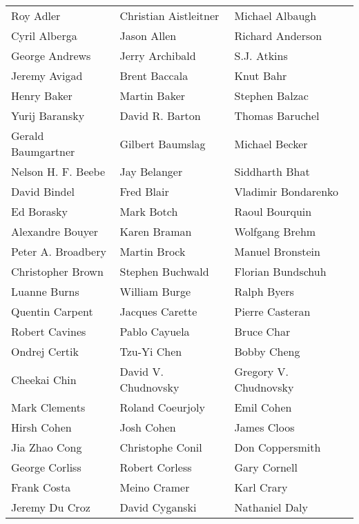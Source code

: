 \begin{tabular}{lll}
Roy Adler              & Christian Aistleitner  & Michael Albaugh\\
Cyril Alberga          & Jason Allen            & Richard Anderson\\
George Andrews         & Jerry Archibald        & S.J. Atkins\\
Jeremy Avigad          & Brent Baccala          & Knut Bahr\\
Henry Baker            & Martin Baker           & Stephen Balzac\\
Yurij Baransky         & David R. Barton        & Thomas Baruchel\\
Gerald Baumgartner     & Gilbert Baumslag       & Michael Becker\\
Nelson H. F. Beebe     & Jay Belanger           & Siddharth Bhat\\
David Bindel           & Fred Blair             & Vladimir Bondarenko\\
Ed Borasky             & Mark Botch             & Raoul Bourquin\\
Alexandre Bouyer       & Karen Braman           & Wolfgang Brehm\\
Peter A. Broadbery     & Martin Brock           & Manuel Bronstein\\
Christopher Brown      & Stephen Buchwald       & Florian Bundschuh\\
Luanne Burns           & William Burge          & Ralph Byers\\
Quentin Carpent        & Jacques Carette        & Pierre Casteran\\
Robert Cavines         & Pablo Cayuela          & Bruce Char\\
Ondrej Certik          & Tzu-Yi Chen            & Bobby Cheng\\
Cheekai Chin           & David V. Chudnovsky    & Gregory V. Chudnovsky\\
Mark Clements          & Roland Coeurjoly       & Emil Cohen\\
Hirsh Cohen            & Josh Cohen             & James Cloos\\
Jia Zhao Cong          & Christophe Conil       & Don Coppersmith\\
George Corliss         & Robert Corless         & Gary Cornell\\
Frank Costa            & Meino Cramer           & Karl Crary\\
Jeremy Du Croz         & David Cyganski         & Nathaniel Daly\\

\end{tabular}
